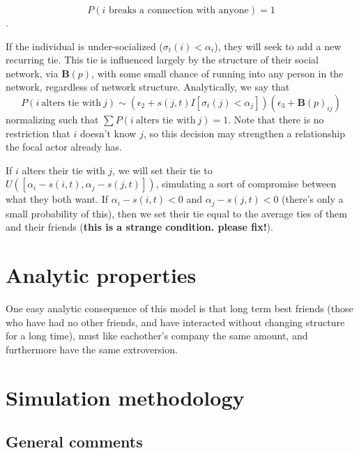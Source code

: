 \documentclass[]{article}
\begin{document}
	$$P(i\text{ breaks a connection with anyone}) = 1$$.
	
	If the individual is under-socialized ($\sigma_t(i) < \alpha_i$), they will seek to add a new recurring tie.
	This tie is influenced largely by the structure of their social network, via $\textbf{B}(p)$, with some small chance of running into any person in the network, regardless of network structure.
	Analytically, we say that
	\[
		P(i~\text{alters tie with}~j)
		 \sim
		( 
			\epsilon_2 + 
			s(j,t) I[ \sigma_t(j) < \alpha_j ] 
		)
		(
			\epsilon_3 +
			\textbf{B}(p)_{ij}
		)
	\]
	normalizing such that $\sum P(i~\text{alters tie with}~j) = 1$. Note that there is no restriction that $i$ doesn't know $j$, so this decision may strengthen a relationship the focal actor already has.
	
	If $i$ alters their tie with $j$, we will set their tie to $U( [\alpha_i - s(i,t), \alpha_j - s(j,t)] )$, simulating a sort of compromise between what they both want. If $\alpha_i - s(i,t) < 0$ and $\alpha_j - s(j,t) < 0$ (there's only a small probability of this), then we set their tie equal to the average ties of them and their friends (\textbf{this is a strange condition. please fix!}). 
	
	\section{Analytic properties}

	One easy analytic consequence of this model is that long term best friends (those who have had no other friends, and have interacted without changing structure for a long time), must like eachother's company the same amount, and furthermore have the same extroversion.
	
	\section{Simulation methodology}
	\subsection{General comments}
\end{document}
